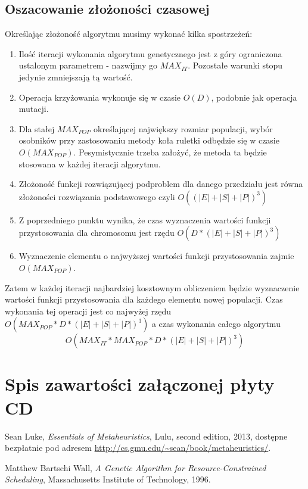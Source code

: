 \documentclass[12pt,a4paper]{article}
\theoremstyle{definition}
\begin{document}
\subsection{Oszacowanie złożoności czasowej} \label{complexity}
Określając złożoność algorytmu musimy wykonać kilka spostrzeżeń:
\begin{enumerate}
	\item Ilość iteracji wykonania algorytmu genetycznego jest z góry ograniczona ustalonym parametrem - nazwijmy go $MAX_{IT}$. Pozostałe warunki stopu jedynie zmniejszają tą wartość.
	\item Operacja krzyżowania wykonuje się w czasie $O(D)$, podobnie jak operacja mutacji.
	\item Dla stałej $MAX_{POP}$ określającej największy rozmiar populacji, wybór osobników przy zastosowaniu metody koła ruletki odbędzie się w czasie $O(MAX_{POP})$. Pesymistycznie trzeba założyć, że metoda ta będzie stosowana w każdej iteracji algorytmu.
	\item Złożoność funkcji rozwiązującej podproblem dla danego przedziału jest równa złożoności rozwiązania podstawowego czyli $O((|E| + |S| + |P|)^3)$
	\item Z poprzedniego punktu wynika, że czas wyznaczenia wartości funkcji przystosowania dla chromosomu jest rzędu $O(D * (|E| + |S| + |P|)^3)$
	\item Wyznaczenie elementu o najwyższej wartości funkcji przystosowania zajmie \\$O(MAX_{POP})$.
\end{enumerate}
Zatem w każdej iteracji najbardziej kosztownym obliczeniem będzie wyznaczenie wartości funkcji przystosowania dla każdego elementu nowej populacji. Czas wykonania tej operacji jest co najwyżej rzędu $O(MAX_{POP} * D * (|E| + |S| + |P|)^3)$ a czas wykonania całego algorytmu
$$O(MAX_{IT} * MAX_{POP} * D * (|E| + |S| + |P|)^3)$$

\newpage
\section{Spis zawartości załączonej płyty CD}

\newpage
\begin{thebibliography}{9}
	Sean Luke,
	\emph{Essentials of Metaheuristics},
	Lulu,
	second edition,
	2013,
	dostępne bezpłatnie pod adresem \url{http://cs.gmu.edu/~sean/book/metaheuristics/}.

	Matthew Bartschi Wall,
	\emph{A Genetic Algorithm for Resource-Constrained Scheduling},
	Massachusetts Institute of Technology,
	1996.
\end{thebibliography}
\end{document}
